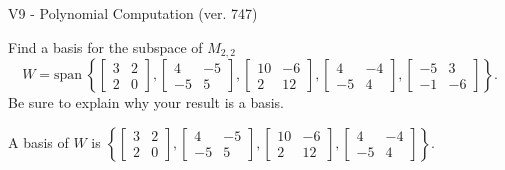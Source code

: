 \begin{exercise}
  \begin{exerciseTitle}V9 - Polynomial Computation (ver. 747)\end{exerciseTitle}
  \begin{exerciseStatement}
    Find a basis for the subspace of \(M_{2,2}\) 
\[W=\mathrm{span}\ \left\{\left[\begin{array}{cc}
3 & 2 \\
2 & 0
\end{array}\right] , \left[\begin{array}{cc}
4 & -5 \\
-5 & 5
\end{array}\right] , \left[\begin{array}{cc}
10 & -6 \\
2 & 12
\end{array}\right] , \left[\begin{array}{cc}
4 & -4 \\
-5 & 4
\end{array}\right] , \left[\begin{array}{cc}
-5 & 3 \\
-1 & -6
\end{array}\right]\right\}.\]
 Be sure to explain why your result is a basis.


  \end{exerciseStatement}
  \begin{exerciseAnswer}
   A basis of \(W\) is  \(\left\{\left[\begin{array}{cc}
3 & 2 \\
2 & 0
\end{array}\right] , \left[\begin{array}{cc}
4 & -5 \\
-5 & 5
\end{array}\right] , \left[\begin{array}{cc}
10 & -6 \\
2 & 12
\end{array}\right] , \left[\begin{array}{cc}
4 & -4 \\
-5 & 4
\end{array}\right]\right\}\).
  


  \end{exerciseAnswer}
\end{exercise}